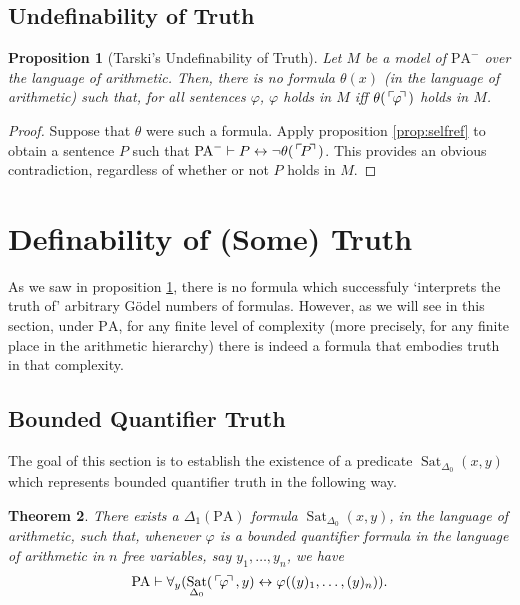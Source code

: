 \documentclass{article}
\newtheorem{theorem}{Theorem}[subsection]
\newtheorem{prop}[theorem]{Proposition}
\theoremstyle{nonumberplain}
\newtheorem{proof}{Proof}
\newcommand{\PA}{\mathrm{PA}}
\newcommand{\WPA}{\PA^-}
\DeclareMathOperator{\Sat}{Sat}
\newcommand{\gn}[1]{\setbox0=\hbox{$\mathclap{\phantom{t}}#1$} \dimen0=\ht0 \advance\dimen0 by -1.25ex \,\raise\dimen0\hbox{$\ulcorner$} \! \box0 \! \raise\dimen0\hbox{$\urcorner$}\,}
\begin{document}
\subsection{Undefinability of Truth}\label{sec:tarski}

\begin{prop}[Tarski's Undefinability of Truth]\label{prop:tarski}
Let $M$ be a model of $\WPA$ over the language of arithmetic. Then, there is no formula $\theta(x)$ (in the language of arithmetic) such that, for all sentences $\varphi$, $\varphi$ holds in $M$ iff $\theta(\gn\varphi)$ holds in $M$.
\end{prop}

\begin{proof}
Suppose that $\theta$ were such a formula. Apply proposition \ref{prop:selfref} to obtain a sentence $P$ such that $\WPA \vdash P \leftrightarrow \neg\theta(\gn P)$. This provides an obvious contradiction, regardless of whether or not $P$ holds in $M$.
\end{proof}

\section{Definability of (Some) Truth}

As we saw in proposition \ref{prop:tarski}, there is no formula which successfuly `interprets the truth of' arbitrary Gödel numbers of formulas. However, as we will see in this section, under $\PA$, for any finite level of complexity (more precisely, for any finite place in the arithmetic hierarchy) there is indeed a formula that embodies truth in that complexity.

\subsection{Bounded Quantifier Truth}

The goal of this section is to establish the existence of a predicate $\Sat_{\Delta_0}(x, y)$ which represents bounded quantifier truth in the following way.

\begin{theorem}\label{thm:satdelta0}
There exists a $\Delta_1(\PA)$ formula $\Sat_{\Delta_0}(x,y)$, in the language of arithmetic, such that, whenever $\varphi$ is a bounded quantifier formula in the language of arithmetic in $n$ free variables, say $y_1, \dots, y_n$, we have
\begin{equation}\label{eq:satdelta0}
\PA \vdash \forall_y (\Sat_{\Delta_0}(\gn{\varphi}, y) \leftrightarrow \varphi((y)_1, \dots, (y)_n)).
\end{equation}
\end{theorem}
\end{document}
